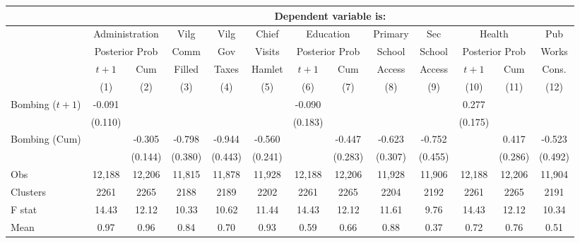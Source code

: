 \begin{tabular}{lcccccccccccc}
\hline  & \multicolumn{12}{c}{Dependent variable is:}\\
\hline  & \multicolumn{2}{c}{Administration} & Vilg & Vilg & Chief & \multicolumn{2}{c}{Education} & Primary & Sec & \multicolumn{2}{c}{Health} & Pub\\
 & \multicolumn{2}{c}{Posterior Prob} & Comm & Gov & Visits & \multicolumn{2}{c}{Posterior Prob} & School & School & \multicolumn{2}{c}{Posterior Prob} & Works\\
 & $ t+1$ & Cum & Filled & Taxes & Hamlet & $ t+1$ & Cum & Access & Access & $ t+1$ & Cum & Cons.\\
 & (1) & (2) & (3) & (4) & (5) & (6) & (7) & (8) & (9) & (10) & (11) & (12)\\
\hline Bombing ($ t+1$) & -0.091 &  &  &  &  & -0.090 &  &  &  & 0.277 &  & \\
 & (0.110) &  &  &  &  & (0.183) &  &  &  & (0.175) &  & \\
Bombing (Cum) &  & -0.305 & -0.798 & -0.944 & -0.560 &  & -0.447 & -0.623 & -0.752 &  & 0.417 & -0.523\\
 &  & (0.144) & (0.380) & (0.443) & (0.241) &  & (0.283) & (0.307) & (0.455) &  & (0.286) & (0.492)\\
Obs & 12,188 & 12,206 & 11,815 & 11,878 & 11,928 & 12,188 & 12,206 & 11,928 & 11,906 & 12,188 & 12,206 & 11,904\\
Clusters & 2261  & 2265  & 2188  & 2189  & 2202  & 2261  & 2265  & 2204  & 2192  & 2261  & 2265  & 2191 \\
F stat & 14.43  & 12.12  & 10.33  & 10.62  & 11.44  & 14.43  & 12.12  & 11.61  & 9.76  & 14.43  & 12.12  & 10.34 \\
Mean & 0.97 & 0.96 & 0.84 & 0.70 & 0.93 & 0.59 & 0.66 & 0.88 & 0.37 & 0.72 & 0.76 & 0.51\\
\hline\end{tabular}\\

